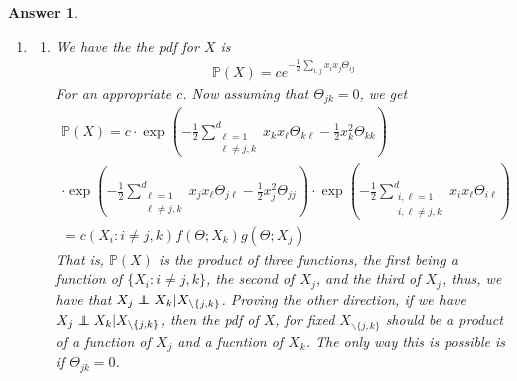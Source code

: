 \documentclass[12pt]{article}
\newcommand\independent{\protect\mathpalette{\protect\independenT}{\perp}}
\def\independenT#1#2{\mathrel{\rlap{$#1#2$}\mkern2mu{#1#2}}}
\theoremstyle{colon}
\newtheorem*{answer}{Answer}
\begin{document}
\clearpage

\begin{answer}
  \leavevmode
  \begin{enumerate}[label=\arabic*)]
    \item \leavevmode
      \begin{enumerate}[label=\alph*)]
        \item We have the the pdf for $X$ is
          \begin{gather*}
            \mathbb{P}(X) = c e^{-\frac{1}{2} \sum_{i,j} x_i x_j \Theta_{ij}}
          \end{gather*}
          For an appropriate $c$. Now assuming that $\Theta_{jk} = 0$, we get
          \begin{gather*}
            \mathbb{P}(X) = c \cdot \exp(-\frac{1}{2} \sum_{\substack{\ell =1 \\ \ell \neq j,k}}^d x_k x_\ell \Theta_{k \ell} - \frac{1}{2} x_k^2 \Theta_{kk}) \\
            \cdot \exp(-\frac{1}{2} \sum_{\substack{\ell =1 \\ \ell \neq j,k}}^d x_j x_\ell \Theta_{j \ell} - \frac{1}{2} x_j^2 \Theta_{jj}) \cdot \exp( -\frac{1}{2} \sum_{\substack{i, \ell =1 \\ i, \ell \neq j,k}}^d x_i x_\ell \Theta_{i \ell}) \\
            = c(X_i : i \neq j,k) f(\Theta; X_k) g(\Theta; X_j)
          \end{gather*}
          That is, $\mathbb{P}(X)$ is the product of three functions, the first being a function of $\{X_i : i \neq j,k\}$, the second of $X_j$, and the third of $X_j$, thus, we have that $X_j \independent X_k | X_{\backslash \{j,k\}}$. Proving the other direction, if we have $X_j \independent X_k | X_{\backslash \{j,k\}}$, then the pdf of $X$, for fixed $X_{\backslash \{j,k\}}$ should be a product of a function of $X_j$ and a fucntion of $X_k$. The only way this is possible is if $\Theta_{jk} = 0$.


\end{enumerate}
\end{enumerate}
\end{answer}
\end{document}
